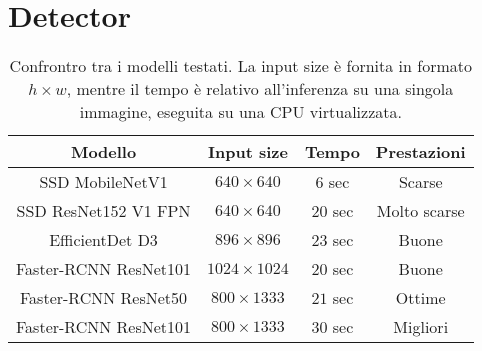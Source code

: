 \section{Detector}

\begin{comment}
    Breve descrizione e motivazione della scelta
    Tabellina che abbiamo fatto noi
    Tabellina di Object Recognition Model Zoo
    Almeno immagine finale
\end{comment}

\begin{table}
    \centering
    \begin{tabular}{|c|c|c|c|} 
     \hline
     \textbf{Modello} & \textbf{Input size} & \textbf{Tempo} & \textbf{Prestazioni} \\
     \hline
     SSD MobileNetV1 & $640 \times 640$ & $6$ sec & Scarse \\
     \hline
     SSD ResNet152 V1 FPN & $640 \times 640$ & $20$ sec & Molto scarse \\
     \hline
     EfficientDet D3 & $896 \times 896$ & $23$ sec & Buone \\
     \hline
     Faster-RCNN ResNet101 & $1024 \times 1024$ & $20$ sec & Buone \\
     \hline
     Faster-RCNN ResNet50 & $800 \times 1333$ & $21$ sec & Ottime \\
     \hline
     Faster-RCNN ResNet101 & $800 \times 1333$ & $30$ sec & Migliori \\
     \hline
    \end{tabular}
    \caption{Confrontro tra i modelli testati. La input size è fornita in formato $h\times w$, mentre il tempo è relativo all'inferenza su una singola immagine, eseguita su una CPU virtualizzata.}
    \label{table:modelli}
\end{table}

